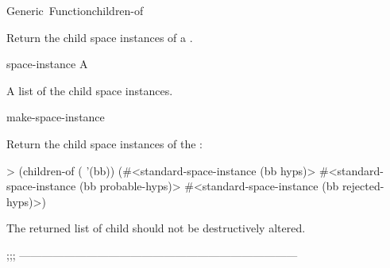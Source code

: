 \documentclass[10pt,twoside,english,pdftex]{article}
\begin{document}

\begin{functiondoc}{Generic~Function}{children-of}%
  {
    \returns{} }
%

\fnsyntax

\fnpurpose Return the child space instances of a .

\fnmethods
{}%
  {\code{(} 
    \returns{} }

\fnpackage {}

\fnmodule {}

\fnargs
\begin{args}{space-instance}
 A 
\end{args}

\fnreturns A list of the child space instances.

\begin{alsos}{make-space-instance}
\also[parent-of]
\end{alsos}

\fnexample
{}%
Return the child space instances  of the  :
\begin{example}
> (children-of ( '(bb))
(#<standard-space-instance (bb hyps)>
 #<standard-space-instance (bb probable-hyps)>
 #<standard-space-instance (bb rejected-hyps)>)
\end{example}

\fnnote The returned list of child  should not be
destructively altered.

\end{functiondoc}

;;; ---------------------------------------------------------------------------
\end{document}
